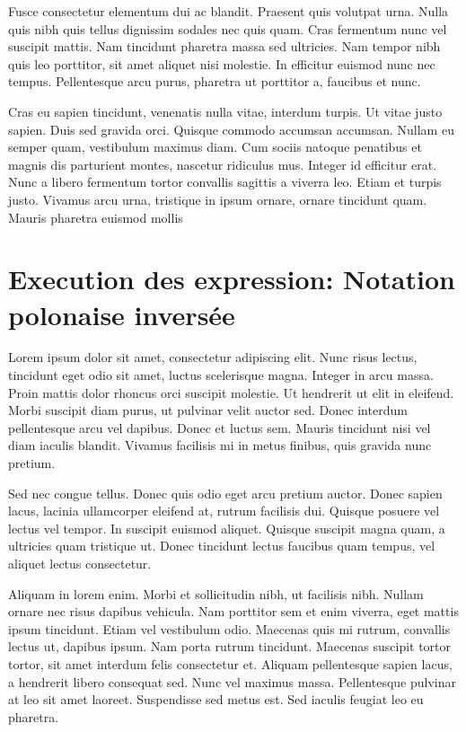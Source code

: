 \documentclass{report}
\begin{document}
            Fusce consectetur elementum dui ac blandit. Praesent quis volutpat urna. Nulla quis nibh quis tellus dignissim sodales nec quis quam. Cras fermentum nunc vel suscipit mattis. Nam tincidunt pharetra massa sed ultricies. Nam tempor nibh quis leo porttitor, sit amet aliquet nisi molestie. In efficitur euismod nunc nec tempus. Pellentesque arcu purus, pharetra ut porttitor a, faucibus et nunc.

            Cras eu sapien tincidunt, venenatis nulla vitae, interdum turpis. Ut vitae justo sapien. Duis sed gravida orci. Quisque commodo accumsan accumsan. Nullam eu semper quam, vestibulum maximus diam. Cum sociis natoque penatibus et magnis dis parturient montes, nascetur ridiculus mus. Integer id efficitur erat. Nunc a libero fermentum tortor convallis sagittis a viverra leo. Etiam et turpis justo. Vivamus arcu urna, tristique in ipsum ornare, ornare tincidunt quam. Mauris pharetra euismod mollis


        \section{Execution des expression: Notation polonaise inversée}
            Lorem ipsum dolor sit amet, consectetur adipiscing elit. Nunc risus lectus, tincidunt eget odio sit amet, luctus scelerisque magna. Integer in arcu massa. Proin mattis dolor rhoncus orci suscipit molestie. Ut hendrerit ut elit in eleifend. Morbi suscipit diam purus, ut pulvinar velit auctor sed. Donec interdum pellentesque arcu vel dapibus. Donec et luctus sem. Mauris tincidunt nisi vel diam iaculis blandit. Vivamus facilisis mi in metus finibus, quis gravida nunc pretium.

            Sed nec congue tellus. Donec quis odio eget arcu pretium auctor. Donec sapien lacus, lacinia ullamcorper eleifend at, rutrum facilisis dui. Quisque posuere vel lectus vel tempor. In suscipit euismod aliquet. Quisque suscipit magna quam, a ultricies quam tristique ut. Donec tincidunt lectus faucibus quam tempus, vel aliquet lectus consectetur.

            Aliquam in lorem enim. Morbi et sollicitudin nibh, ut facilisis nibh. Nullam ornare nec risus dapibus vehicula. Nam porttitor sem et enim viverra, eget mattis ipsum tincidunt. Etiam vel vestibulum odio. Maecenas quis mi rutrum, convallis lectus ut, dapibus ipsum. Nam porta rutrum tincidunt. Maecenas suscipit tortor tortor, sit amet interdum felis consectetur et. Aliquam pellentesque sapien lacus, a hendrerit libero consequat sed. Nunc vel maximus massa. Pellentesque pulvinar at leo sit amet laoreet. Suspendisse sed metus est. Sed iaculis feugiat leo eu pharetra.
\end{document}
